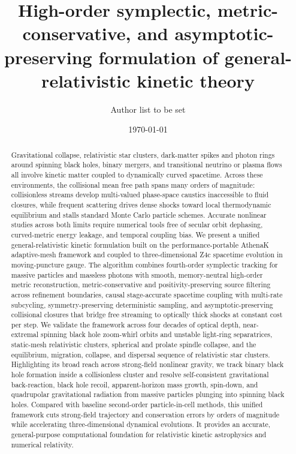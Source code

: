 \title{High-order symplectic, metric-conservative, and asymptotic-preserving formulation of general-relativistic kinetic theory}

\author{Author list to be set}
\noaffiliation

\date{\today}

\begin{abstract}
Gravitational collapse, relativistic star clusters, dark-matter spikes and photon rings around spinning black holes, binary mergers, and transitional neutrino or plasma flows all involve kinetic matter coupled to dynamically curved spacetime. Across these environments, the collisional mean free path spans many orders of magnitude: collisionless streams develop multi-valued phase-space caustics inaccessible to fluid closures, while frequent scattering drives dense shocks toward local thermodynamic equilibrium and stalls standard Monte Carlo particle schemes. Accurate nonlinear studies across both limits require numerical tools free of secular orbit dephasing, curved-metric energy leakage, and temporal coupling bias. We present a unified general-relativistic kinetic formulation built on the performance-portable AthenaK adaptive-mesh framework and coupled to three-dimensional Z4c spacetime evolution in moving-puncture gauge. The algorithm combines fourth-order symplectic tracking for massive particles and massless photons with smooth, memory-neutral high-order metric reconstruction, metric-conservative and positivity-preserving source filtering across refinement boundaries, causal stage-accurate spacetime coupling with multi-rate subcycling, symmetry-preserving deterministic sampling, and asymptotic-preserving collisional closures that bridge free streaming to optically thick shocks at constant cost per step. We validate the framework across four decades of optical depth, near-extremal spinning black hole zoom-whirl orbits and unstable light-ring separatrices, static-mesh relativistic clusters, spherical and prolate spindle collapse, and the equilibrium, migration, collapse, and dispersal sequence of relativistic star clusters. Highlighting its broad reach across strong-field nonlinear gravity, we track binary black hole formation inside a collisionless cluster and resolve self-consistent gravitational back-reaction, black hole recoil, apparent-horizon mass growth, spin-down, and quadrupolar gravitational radiation from massive particles plunging into spinning black holes. Compared with baseline second-order particle-in-cell methods, this unified framework cuts strong-field trajectory and conservation errors by orders of magnitude while accelerating three-dimensional dynamical evolutions. It provides an accurate, general-purpose computational foundation for relativistic kinetic astrophysics and numerical relativity.
\end{abstract}

\maketitle
